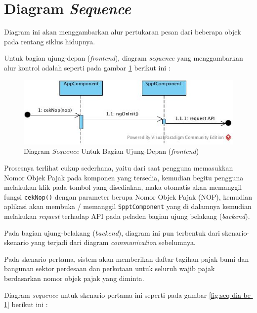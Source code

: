 \section{Diagram \textit{Sequence}}

Diagram ini akan menggambarkan alur pertukaran pesan dari beberapa objek pada rentang siklus hidupnya.

Untuk bagian ujung-depan (\textit{frontend}), diagram \textit{sequence} yang menggambarkan alur kontrol adalah seperti pada gambar \ref{fig:seq-dia-fe} berikut ini :

\begin{figure}[H]
	\centering
	\includegraphics[width=1\textwidth]{./resources/uml/seq-dia-fe}
	\caption{Diagram \textit{Sequence} Untuk Bagian Ujung-Depan (\textit{frontend})}
	\label{fig:seq-dia-fe}
\end{figure}

Prosesnya terlihat cukup sederhana, yaitu dari saat pengguna memasukkan Nomor Objek Pajak pada komponen yang tersedia, kemudian begitu pengguna melakukan klik pada tombol yang disediakan, maka otomatis akan memanggil fungsi \texttt{cekNop()} dengan parameter berupa Nomor Objek Pajak (NOP), kemudian aplikasi akan membuka / memanggil \texttt{SpptComponent} yang di dalamnya kemudian melakukan \textit{request} terhadap API pada peladen bagian ujung belakang (\textit{backend}).

Pada bagian ujung-belakang (\textit{backend}), diagram ini pun terbentuk dari skenario-skenario yang terjadi dari diagram \textit{communication} sebelumnya.

Pada skenario pertama, sistem akan memberikan daftar tagihan pajak bumi dan bangunan sektor perdesaan dan perkotaan untuk seluruh wajib pajak berdasarkan nomor objek pajak yang diminta.

Diagram \textit{sequence} untuk skenario pertama ini seperti pada gambar \ref{fig:seq-dia-be-1} berikut ini :

